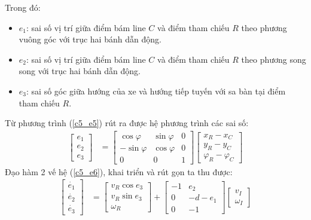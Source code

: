           \newpage
          Trong đó:
          \begin{itemize}
               \item $e_1$: sai số vị trí giữa điểm bám line $C$ và điểm tham chiếu $R$ theo phương vuông góc với trục hai bánh dẫn động.
               \item $e_2$: sai số vị trí giữa điểm bám line $C$ và điểm tham chiếu $R$ theo phương song song với trục hai bánh dẫn động.
               \item $e_3$: sai số góc giữa hướng của xe và hướng tiếp tuyến với sa bàn tại điểm tham chiếu $R$.
          \end{itemize}    
          \hspace*{0.6cm}Từ phương trình (\ref{c5_e5}) rút ra được hệ phương trình các sai số:
          \begin{align}
               \begin{bmatrix}
                    e_1 \\
                    e_2 \\
                    e_3
                    \end{bmatrix} &= \begin{bmatrix}
                    \cos\varphi & \sin \varphi & 0 \\
                    -\sin\varphi & \cos \varphi & 0 \\
                    0 & 0 & 1
                    \end{bmatrix} \begin{bmatrix}
                    x_R - x_C \\
                    y_R - y_C \\
                    \varphi_R - \varphi_C
               \end{bmatrix}
               \label{c5_e6}
          \end{align}
          \hspace*{0.6cm}Đạo hàm 2 vế hệ (\ref{c5_e6}), khai triển và rút gọn ta thu được: 
          \begin{align}
               \begin{bmatrix}
                    \dot{e_1} \\
                    \dot{e_2} \\
                    \dot{e_3}
                    \end{bmatrix} &= \begin{bmatrix}
                    v_R \cos e_3 \\
                    v_R \sin e_3 \\
                    \omega_R
                    \end{bmatrix} + \begin{bmatrix}
                    -1 & e_2 \\
                    0 & -d - e_1 \\
                    0 & -1
                    \end{bmatrix} \begin{bmatrix}
                    v_I \\
                    \omega_I
               \end{bmatrix}
               \label{c5_e7}
          \end{align}       
